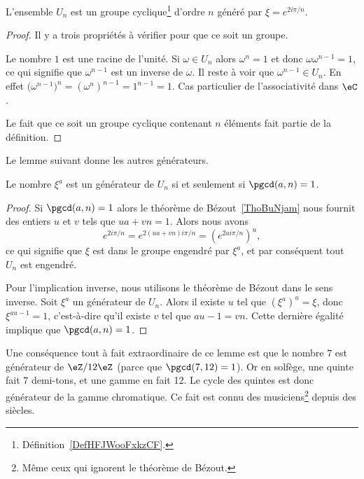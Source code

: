 \begin{lemma}       \label{LemWHQGooXyeJiw}
	L'ensemble \( U_n\) est un groupe cyclique\footnote{Définition~\ref{DefHFJWooFxkzCF}.} d'ordre \( n\) généré par \( \xi= e^{2i\pi/n}\).
\end{lemma}

\begin{proof}
	Il y a trois propriétés à vérifier pour que ce soit un groupe.
	\begin{subproof}
		\spitem[Neutre]
		Le nombre \( 1\) est une racine de l'unité.
		\spitem[Inverse]
		Si \( \omega\in U_n\) alors \( \omega^n=1\) et donc \( \omega\omega^{n-1}=1\), ce qui signifie que \( \omega^{n-1}\) est un inverse de \( \omega\). Il reste à voir que \( \omega^{n-1}\in U_n\). En effet \( \big( \omega^{n-1} \big)^n=(\omega^n)^{n-1}=1^{n-1}=1  \).
		\spitem[Associativité]
		Cas particulier de l'associativité dans \( \eC\).
	\end{subproof}
	Le fait que ce soit un groupe cyclique contenant \( n\) éléments fait partie de la définition.
\end{proof}

Le lemme suivant donne les autres générateurs.
\begin{lemma}   \label{LemcFTNMa}
	Le nombre \( \xi^a\) est un générateur de \( U_n\) si et seulement si \( \pgcd(a,n)=1\).
\end{lemma}

\begin{proof}
	Si \( \pgcd(a,n)=1\) alors le théorème de Bézout~\ref{ThoBuNjam} nous fournit des entiers \( u\) et \( v\) tels que \( ua+vn=1\). Alors nous avons
	\begin{equation}
		e^{2i\pi /n}= e^{2(ua+vn)i\pi/n}=( e^{2ai\pi/n})^u,
	\end{equation}
	ce qui signifie que \( \xi\) est dans le groupe engendré par \( \xi^a\), et par conséquent tout \( U_n\) est engendré.

	Pour l'implication inverse, nous utilisons le théorème de Bézout dans le sens inverse. Soit \( \xi^a\) un générateur de \( U_n\). Alors il existe \( u\) tel que \( (\xi^a)^u=\xi\), donc \( \xi^{au-1}=1\), c'est-à-dire qu'il existe \( v\) tel que \( au-1=vn\). Cette dernière égalité implique que \( \pgcd(a,n)=1\).
\end{proof}

\begin{example}
	Une conséquence tout à fait extraordinaire de ce lemme est que le nombre \( 7\) est générateur de \( \eZ/12\eZ\) (parce que \( \pgcd(7,12)=1\)). Or en solfège, une quinte fait \( 7\) demi-tons, et une gamme en fait 12. Le cycle des quintes est donc générateur de la gamme chromatique\cite{YDXsAM}. Ce fait est connu des musiciens\footnote{Même ceux qui ignorent le théorème de Bézout.} depuis des siècles.
\end{example}

